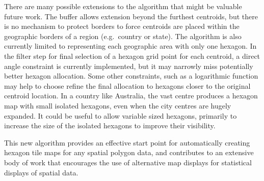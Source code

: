 There are many possible extensions to the algorithm that might be
valuable future work. The buffer allows extension beyond the furthest
centroids, but there is no mechanism to protect borders to force
centroids are placed within the geographic borders of a region
(e.g.~country or state). The algorithm is also currently limited to
representing each geographic area with only one hexagon. In the filter
step for final selection of a hexagon grid point for each centroid, a
direct angle constraint is currently implemented, but it may narrowly
miss potentially better hexagon allocation. Some other constraints, such
as a logarithmic function may help to choose refine the final allocation
to hexagons closer to the original centroid location. In a country like
Australia, the vast centre produces a hexagon map with small isolated
hexagons, even when the city centres are hugely expanded. It could be
useful to allow variable sized hexagons, primarily to increase the size
of the isolated hexagons to improve their visibility.

This new algorithm provides an effective start point for automatically
creating hexagon tile maps for any spatial polygon data, and contributes
to an extensive body of work that encourages the use of alternative map
displays for statistical displays of spatial data.



\address{%
Stephanie Kobakian\\
\\%
Sydney, Australia\\
%
%
%
\href{mailto:stephanie.kobakian@gmail.com}{\nolinkurl{stephanie.kobakian@gmail.com}}%
}

\address{%
Dianne Cook\\
Monash University\\%
Department of Econometrics and Business Statistics\\
%
%
%
\href{mailto:dicook@monash.edu}{\nolinkurl{dicook@monash.edu}}%
}

\address{%
Earl Duncan\\
Queensland University of Technology\\%
School of Mathematical Sciences\\
%
%
%
\href{mailto:earl.duncan@qut.edu.au}{\nolinkurl{earl.duncan@qut.edu.au}}%
}
